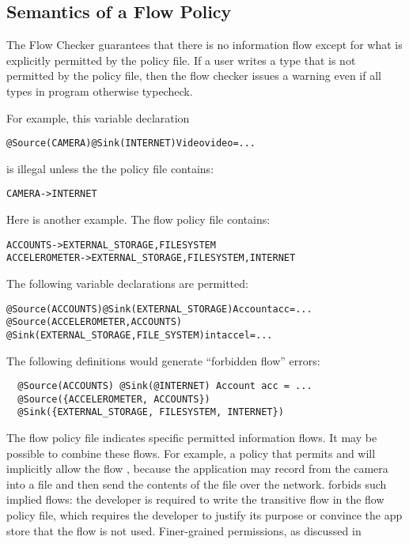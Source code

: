\subsection{Semantics of a Flow Policy}
\label{sec:undsiredflows}
The Flow Checker guarantees that there is no information
flow except for what is explicitly permitted by the policy file. If a user writes a type that is
not permitted by the policy file, then the flow checker issues a warning
even if all types in program otherwise typecheck.

For example, this variable declaration

\begin{alltt}
@Source(CAMERA) @Sink(INTERNET) Video video = ...
\end{alltt}

\noindent
is illegal unless the the policy file contains:

\begin{alltt}
CAMERA -> INTERNET
\end{alltt}

Here is another example.
The flow policy file contains:
\begin{alltt}
  ACCOUNTS      -> EXTERNAL_STORAGE, FILESYSTEM
  ACCELEROMETER -> EXTERNAL_STORAGE, FILESYSTEM, INTERNET
\end{alltt}

The following variable declarations are permitted:
\begin{alltt}
  @Source(ACCOUNTS) @Sink(EXTERNAL_STORAGE) Account acc = ...
  @Source({ACCELEROMETER, ACCOUNTS})
  @Sink({EXTERNAL_STORAGE, FILE_SYSTEM}) int accel = ...
\end{alltt}

The following definitions would generate ``forbidden flow'' errors:
\begin{Verbatim}
  @Source(ACCOUNTS) @Sink(@INTERNET) Account acc = ...
  @Source({ACCELEROMETER, ACCOUNTS})
  @Sink({EXTERNAL_STORAGE, FILESYSTEM, INTERNET})
\end{Verbatim}

\label{sec:flow-policy-transitivity}
The flow policy file indicates specific permitted information flows.  It
may be possible to combine these flows.
For example, a policy that permits
 and 
will implicitly allow the flow ,
because the application may record from the camera into a file
and then send the contents of the file over the network.
\TheFlowChecker forbids such implied flows:  the developer is required to write
the transitive flow in the flow policy file, which requires the developer
to justify its purpose or convince the app store that the flow is not used.
Finer-grained permissions, as discussed in


